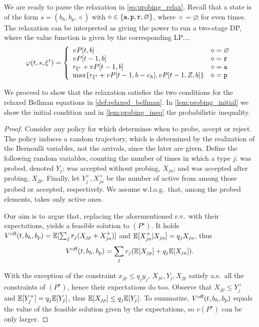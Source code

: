 We are ready to parse the relaxation in \cref{eq:probing_relax}.
Recall that a state is of the form $s=(b_h,b_p,\diamond)$ with $\diamond\in \{\texttt{a},\texttt{p},\texttt{r},\varnothing\}$, where $\diamond=\varnothing$ for even times.
The relaxation can be interpreted as giving \off the power to run a two-stage DP, where the value function is given by the corresponding LP.... \todonote
\begin{equation}\label{eq:probing_relax}
\varphi(t,s,\xi^t) = \left\{ 
\begin{array}{ll}
vP[t,b] & \diamond=\varnothing \\ 
vP[t-1,b] & \diamond = \texttt{r} \\ 
r_{\xi^t}+vP[t-1,b] & \diamond = \texttt{a} \\ 
\max\{r_{\xi^t}+vP[t-1,b-e_h],vP[t-1,Z,b]\} & \diamond = \texttt{p}
\end{array} 
\right.
\end{equation}

We proceed to show that the relaxation satisfies the two conditions for the relaxed Bellman equations in \cref{def:relaxed_bellman}.
In \cref{lem:probing_initial} we show the initial condition and in \cref{lem:probing_ineq} the probabilistic inequality.


\begin{proof}
Consider any policy for \off which determines when to probe, accept or reject.
The policy induces a random trajectory, which is determined by the realization of the Bernoulli variables, not the arrivals, since the later are given.
Define the following random variables, counting the number of times in which a type $j$: was probed, denoted $Y_j$; was accepted without probing, $X_{ja}$; and was accepted after probing, $X_{jp}$.
Finally, let $Y_{j}^+,X_{ja}^+$ be the number of active from among those probed or accepted, respectively.
We assume w.l.o.g.\ that, among the probed elements, \off takes only active ones.

Our aim is to argue that, replacing the aforementioned r.v.\ with their expectations, yields a feasible solution to $(P^\star)$.
It holds $V^{\text{off}}(t,b_h,b_p) = \mathbb{E}[\sum_j r_j(X_{jp}+X_{ja}^+)]$ and $\mathbb{E}[X_{ja}^+|X_{ja}]=q_jX_{ja}$, thus
\[
V^{\text{off}}(t,b_h,b_p) = \sum_jr_j(\mathbb{E}[X_{jp}]+q_j\mathbb{E}[X_{ja}]).
\] 

With the exception of the constraint $x_{jp}\leq q_jy_j$, $X_{ja},Y_j,X_{jp}$ satisfy a.s.\ all the constraints of $(P^\star)$, hence their expectations do too.
Observe that $X_{jp}\leq Y_{j}^+$ and $\mathbb{E}[Y_j^+]=q_j\mathbb{E}[Y_j]$, thus $\mathbb{E}[X_{jp}]\leq q_j\mathbb{E}[Y_j]$.
To summarize, $V^{\text{off}}(t,b_h,b_p)$ equals the value of the feasible solution given by the expectations, so $v(P^\star)$ can be only larger.
\end{proof}

